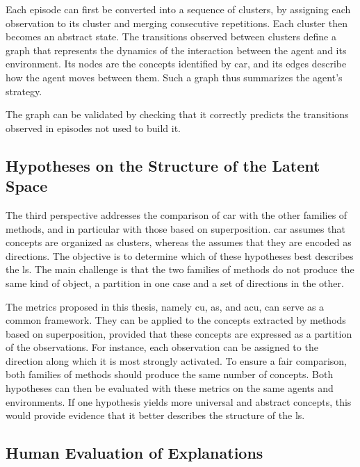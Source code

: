 Each episode can first be converted into a sequence of clusters, by assigning each observation to its cluster and merging consecutive repetitions.
Each cluster then becomes an abstract state.
The transitions observed between clusters define a graph that represents the dynamics of the interaction between the agent and its environment.
Its nodes are the concepts identified by \gls{car}, and its edges describe how the agent moves between them.
Such a graph thus summarizes the agent's strategy.

The graph can be validated by checking that it correctly predicts the transitions observed in episodes not used to build it.

\subsection{Hypotheses on the Structure of the Latent Space}
\label{subsec:conclusion_perspectives_latent_structure}

The third perspective addresses the comparison of \gls{car} with the other families of methods, and in particular with those based on superposition.
\gls{car} assumes that concepts are organized as clusters, whereas the \SuperpositionHypothesisName assumes that they are encoded as directions.
The objective is to determine which of these hypotheses best describes the \gls{ls}.
The main challenge is that the two families of methods do not produce the same kind of object, a partition in one case and a set of directions in the other.

The metrics proposed in this thesis, namely \gls{cu}, \gls{as}, and \gls{acu}, can serve as a common framework.
They can be applied to the concepts extracted by methods based on superposition, provided that these concepts are expressed as a partition of the observations.
For instance, each observation can be assigned to the direction along which it is most strongly activated.
To ensure a fair comparison, both families of methods should produce the same number of concepts.
Both hypotheses can then be evaluated with these metrics on the same agents and environments.
If one hypothesis yields more universal and abstract concepts, this would provide evidence that it better describes the structure of the \gls{ls}.

\subsection{Human Evaluation of Explanations}
\label{subsec:conclusion_perspectives_human_evaluation}

